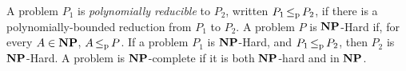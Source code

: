  A problem $P_1$ is \emph{polynomially reducible} to $P_2$, written $P_1 \lep P_2$, if there is a polynomially-bounded reduction from $P_1$ to $P_2$. 
 A problem $P$ is $\NP$-Hard if, for every $A \in \NP$, $A \lep P$. If a problem $P_1$ is $\NP$-Hard, and $P_1 \lep P_2$, then $P_2$ is $\NP$-Hard.
 A problem is $\NP$-complete if it is both $\NP$-hard and in $\NP$.